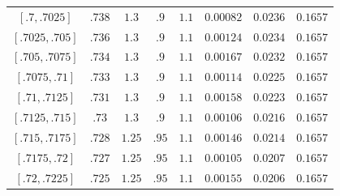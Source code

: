 \begin{center}
\begin{longtable}{@{}cccccccc@{}}
$[.7,.7025]$ & $.738$ & $1.3$ & $.9$ & $1.1$ & $0.00082$ & $0.0236$ & $0.1657$ \\
$[.7025,.705]$ & $.736$ & $1.3$ & $.9$ & $1.1$ & $0.00124$ & $0.0234$ & $0.1657$ \\
$[.705,.7075]$ & $.734$ & $1.3$ & $.9$ & $1.1$ & $0.00167$ & $0.0232$ & $0.1657$ \\
$[.7075,.71]$ & $.733$ & $1.3$ & $.9$ & $1.1$ & $0.00114$ & $0.0225$ & $0.1657$ \\
$[.71,.7125]$ & $.731$ & $1.3$ & $.9$ & $1.1$ & $0.00158$ & $0.0223$ & $0.1657$ \\
$[.7125,.715]$ & $.73$ & $1.3$ & $.9$ & $1.1$ & $0.00106$ & $0.0216$ & $0.1657$ \\
$[.715,.7175]$ & $.728$ & $1.25$ & $.95$ & $1.1$ & $0.00146$ & $0.0214$ & $0.1657$ \\
$[.7175,.72]$ & $.727$ & $1.25$ & $.95$ & $1.1$ & $0.00105$ & $0.0207$ & $0.1657$ \\
$[.72,.7225]$ & $.725$ & $1.25$ & $.95$ & $1.1$ & $0.00155$ & $0.0206$ & $0.1657$ \\
\end{longtable}
\end{center}

